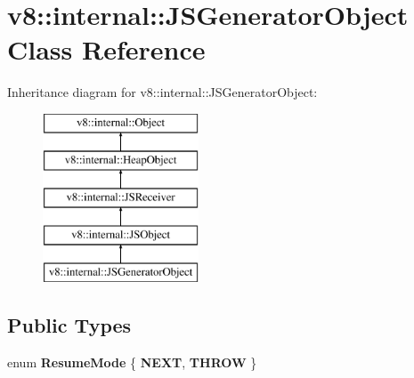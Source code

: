 \hypertarget{classv8_1_1internal_1_1_j_s_generator_object}{}\section{v8\+:\+:internal\+:\+:J\+S\+Generator\+Object Class Reference}
\label{classv8_1_1internal_1_1_j_s_generator_object}
Inheritance diagram for v8\+:\+:internal\+:\+:J\+S\+Generator\+Object\+:\begin{figure}[H]
\begin{center}
\leavevmode
\includegraphics[height=5.000000cm]{classv8_1_1internal_1_1_j_s_generator_object}
\end{center}
\end{figure}
\subsection*{Public Types}
\begin{DoxyCompactItemize}
\item 
\hypertarget{classv8_1_1internal_1_1_j_s_generator_object_a8a7b5950a31ccfb7e1919c4758863d75}{}enum {\bfseries Resume\+Mode} \{ {\bfseries N\+E\+X\+T}, 
{\bfseries T\+H\+R\+O\+W}
 \}\label{classv8_1_1internal_1_1_j_s_generator_object_a8a7b5950a31ccfb7e1919c4758863d75}

\end{DoxyCompactItemize}
